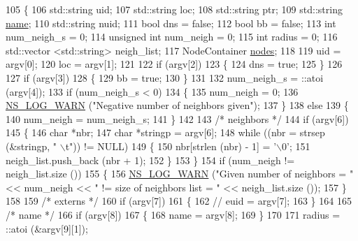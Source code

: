 \begin{DoxyCode}
105 \{
106   std::string uid;
107   std::string loc;
108   std::string ptr;
109   std::string \hyperlink{generate__test__data__lte__spectrum__model_8m_ab74e6bf80237ddc4109968cedc58c151}{name};
110   std::string nuid;
111   \textcolor{keywordtype}{bool} dns = \textcolor{keyword}{false};
112   \textcolor{keywordtype}{bool} bb = \textcolor{keyword}{false};
113   \textcolor{keywordtype}{int} num\_neigh\_s = 0;
114   \textcolor{keywordtype}{unsigned} \textcolor{keywordtype}{int} num\_neigh = 0;
115   \textcolor{keywordtype}{int} radius = 0;
116   std::vector <std::string> neigh\_list;
117   NodeContainer \hyperlink{visualizer-ideas_8txt_a3e1b3808014a2c68ab0cd0182e041be2}{nodes};
118 
119   uid = argv[0];
120   loc = argv[1];
121 
122   \textcolor{keywordflow}{if} (argv[2])
123     \{
124       dns = \textcolor{keyword}{true};
125     \}
126 
127   \textcolor{keywordflow}{if} (argv[3])
128     \{
129       bb = \textcolor{keyword}{true};
130     \}
131 
132   num\_neigh\_s = ::atoi (argv[4]);
133   \textcolor{keywordflow}{if} (num\_neigh\_s < 0)
134     \{
135       num\_neigh = 0;
136       \hyperlink{group__logging_gade7208b4009cdf0e25783cd26766f559}{NS\_LOG\_WARN} (\textcolor{stringliteral}{"Negative number of neighbors given"});
137     \}
138   \textcolor{keywordflow}{else}
139     \{
140       num\_neigh = num\_neigh\_s;
141     \}
142 
143   \textcolor{comment}{/* neighbors */}
144   \textcolor{keywordflow}{if} (argv[6])
145     \{
146       \textcolor{keywordtype}{char} *nbr;
147       \textcolor{keywordtype}{char} *stringp = argv[6];
148       \textcolor{keywordflow}{while} ((nbr = strsep (&stringp, \textcolor{stringliteral}{" \(\backslash\)t"})) != NULL)
149         \{
150           nbr[strlen (nbr) - 1] = \textcolor{charliteral}{'\(\backslash\)0'};
151           neigh\_list.push\_back (nbr + 1);
152         \}
153     \}
154   \textcolor{keywordflow}{if} (num\_neigh != neigh\_list.size ())
155     \{
156       \hyperlink{group__logging_gade7208b4009cdf0e25783cd26766f559}{NS\_LOG\_WARN} (\textcolor{stringliteral}{"Given number of neighbors = "} << num\_neigh << \textcolor{stringliteral}{" != size of neighbors list = 
      "} << neigh\_list.size ());
157     \}
158 
159   \textcolor{comment}{/* externs */}
160   \textcolor{keywordflow}{if} (argv[7])
161     \{
162       \textcolor{comment}{// euid = argv[7];}
163     \}
164 
165   \textcolor{comment}{/* name */}
166   \textcolor{keywordflow}{if} (argv[8])
167     \{
168       name = argv[8];
169     \}
170 
171   radius = ::atoi (&argv[9][1]);

\end{DoxyCode}
